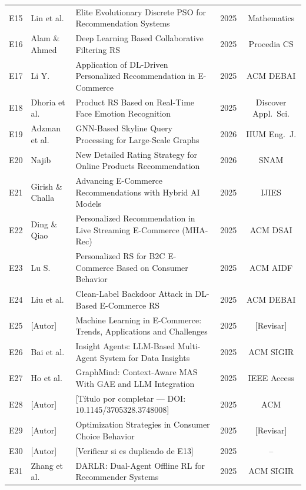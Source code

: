 \documentclass[12pt, a4paper]{article}
\begin{document}
\begin{longtable}{clp{5.8cm}cc}
E15 & Lin et al. &
      Elite Evolutionary Discrete PSO for Recommendation Systems & 2025 & Mathematics \\
E16 & Alam \& Ahmed &
      Deep Learning Based Collaborative Filtering RS & 2025 & Procedia CS \\
E17 & Li Y. &
      Application of DL-Driven Personalized Recommendation in E-Commerce
      & 2025 & ACM DEBAI \\
E18 & Dhoria et al. &
      Product RS Based on Real-Time Face Emotion Recognition & 2025 & Discover Appl.\ Sci. \\
E19 & Adzman et al. &
      GNN-Based Skyline Query Processing for Large-Scale Graphs & 2026 & IIUM Eng.\ J. \\
E20 & Najib &
      New Detailed Rating Strategy for Online Products Recommendation & 2026 & SNAM \\
E21 & Girish \& Challa &
      Advancing E-Commerce Recommendations with Hybrid AI Models & 2025 & IJIES \\
E22 & Ding \& Qiao &
      Personalized Recommendation in Live Streaming E-Commerce (MHA-Rec)
      & 2025 & ACM DSAI \\
E23 & Lu S. &
      Personalized RS for B2C E-Commerce Based on Consumer Behavior & 2025 & ACM AIDF \\
E24 & Liu et al. &
      Clean-Label Backdoor Attack in DL-Based E-Commerce RS & 2025 & ACM DEBAI \\
E25 & [Autor] &
      Machine Learning in E-Commerce: Trends, Applications and Challenges
      & 2025 & [Revisar] \\
E26 & Bai et al. &
      Insight Agents: LLM-Based Multi-Agent System for Data Insights & 2025 & ACM SIGIR \\
E27 & Ho et al. &
      GraphMind: Context-Aware MAS With GAE and LLM Integration & 2025 & IEEE Access \\
E28 & [Autor] &
      [T\'itulo por completar --- DOI: 10.1145/3705328.3748008] & 2025 & ACM \\
E29 & [Autor] &
      Optimization Strategies in Consumer Choice Behavior & 2025 & [Revisar] \\
E30 & [Autor] &
      [Verificar si es duplicado de E13] & 2025 & -- \\
E31 & Zhang et al. &
      DARLR: Dual-Agent Offline RL for Recommender Systems & 2025 & ACM SIGIR \\
\end{longtable}
\end{document}
